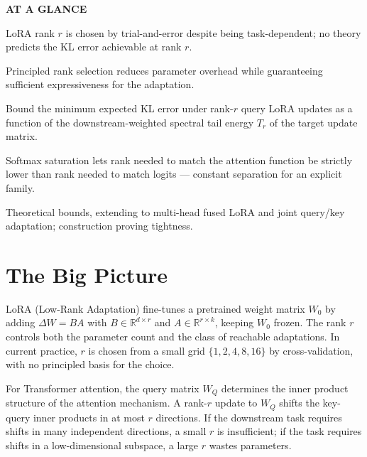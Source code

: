 \documentclass[10pt,twocolumn]{article}
\begin{document}
\begin{mdframed}[backgroundcolor=boxgray,linecolor=rulered,linewidth=1pt,
    innerleftmargin=6pt,innerrightmargin=6pt,
    innertopmargin=6pt,innerbottommargin=6pt]
\textbf{\small AT A GLANCE}\par\vspace{4pt}
\begin{description}[leftmargin=0pt,labelsep=4pt,itemsep=2pt,parsep=0pt,
    font=\small\bfseries]
  \item[Problem:] LoRA rank $r$ is chosen by trial-and-error despite being
    task-dependent; no theory predicts the KL error achievable at rank $r$.
  \item[Why it matters:] Principled rank selection reduces parameter
    overhead while guaranteeing sufficient expressiveness for the adaptation.
  \item[Method:] Bound the minimum expected KL error under rank-$r$ query
    LoRA updates as a function of the downstream-weighted spectral tail energy
    $T_r$ of the target update matrix.
  \item[Result:] Softmax saturation lets rank needed to match the attention
    function be strictly lower than rank needed to match logits — constant
    separation for an explicit family.
  \item[Evidence:] Theoretical bounds, extending to multi-head fused LoRA
    and joint query/key adaptation; construction proving tightness.
\end{description}
\end{mdframed}

\section{The Big Picture}

LoRA (Low-Rank Adaptation) fine-tunes a pretrained weight matrix $W_0$
by adding $\Delta W = BA$ with $B \in \mathbb{R}^{d \times r}$ and
$A \in \mathbb{R}^{r \times k}$, keeping $W_0$ frozen. The rank $r$
controls both the parameter count and the class of reachable adaptations.
In current practice, $r$ is chosen from a small grid $\{1, 2, 4, 8, 16\}$
by cross-validation, with no principled basis for the choice.

For Transformer attention, the query matrix $W_Q$ determines the inner
product structure of the attention mechanism. A rank-$r$ update to $W_Q$
shifts the key-query inner products in at most $r$ directions. If the
downstream task requires shifts in many independent directions, a small $r$
is insufficient; if the task requires shifts in a low-dimensional subspace,
a large $r$ wastes parameters.
\end{document}
